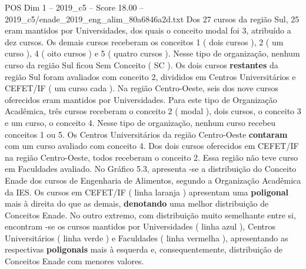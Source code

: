 \begin{textsample}{POS Dim 1 – 2019\_c5 – Score 18.00 – 2019\_c5/enade\_2019\_eng\_alim\_80a6846a2d.txt}
Dos 27 cursos da região Sul, 25 eram mantidos por Universidades, dos quais o conceito modal foi 3, atribuído a dez cursos.
Os demais cursos receberam os conceitos 1 ( dois cursos ), 2 ( um curso ), 4 ( oito cursos ) e 5 ( quatro cursos ).
Nesse tipo de organização, nenhum curso da região Sul ficou Sem Conceito ( SC ).
Os dois cursos \textbf{restantes} da região Sul foram avaliados com conceito 2, divididos em Centros Universitários e CEFET/IF ( um curso cada ).
Na região Centro-Oeste, seis dos nove cursos oferecidos eram mantidos por Universidades.
Para este tipo de Organização Acadêmica, três cursos receberam o conceito 2 ( modal ), dois cursos, o conceito 3 e um curso, o conceito 4.
Nesse tipo de organização, nenhum curso recebeu conceitos 1 ou 5.
Os Centros Universitários da região Centro-Oeste \textbf{contaram} com um curso avaliado com conceito 4.
Dos dois cursos oferecidos em CEFET/IF na região Centro-Oeste, todos receberam o conceito 2.
Essa região não teve curso em Faculdades avaliado.
No Gráfico 5.3, apresenta -se a distribuição do Conceito Enade dos cursos de Engenharia de Alimentos, segundo a Organização Acadêmica da IES.
Os cursos em CEFET/IF ( linha laranja ) apresentam uma \textbf{poligonal} mais à direita do que as demais, \textbf{denotando} uma melhor distribuição de Conceitos Enade.
No outro extremo, com distribuição muito semelhante entre si, encontram -se os cursos mantidos por Universidades ( linha azul ), Centros Universitários ( linha verde ) e Faculdades ( linha vermelha ), apresentando as respectivas \textbf{poligonais} mais à esquerda e, consequentemente, distribuição de Conceitos Enade com menores valores.

\end{textsample}
